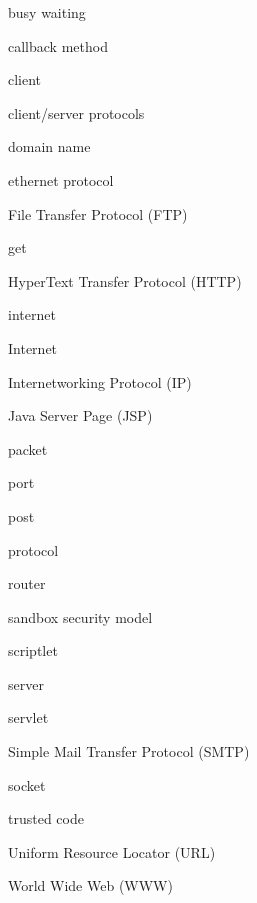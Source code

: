 
\begin{KT}
busy waiting

callback method

client

client/server protocols

domain name

ethernet protocol

File Transfer Protocol (FTP)

get

HyperText Transfer Protocol (HTTP)

internet

Internet

Internetworking Protocol (IP)

Java Server Page (JSP)

packet

port

post

protocol

router

sandbox security model

scriptlet

server

servlet

Simple Mail Transfer Protocol (SMTP)

socket

trusted code

Uniform Resource Locator (URL)

World Wide Web (WWW)

\end{KT}


